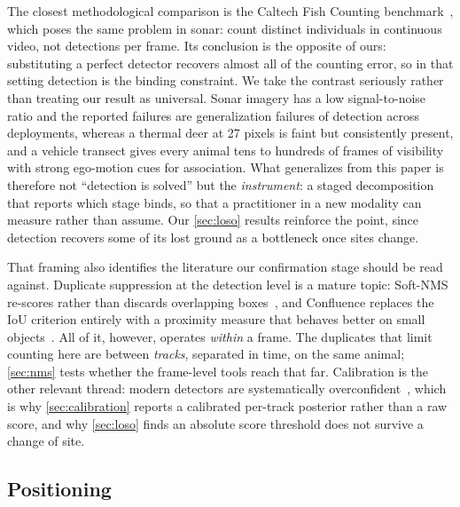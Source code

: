 The closest methodological comparison is the Caltech Fish Counting
benchmark~\cite{kay2022caltech}, which poses the same problem in sonar: count distinct individuals in continuous video, not detections per frame. Its conclusion is the opposite of
ours: substituting a perfect detector recovers almost all of the counting error, so in that
setting detection is the binding constraint. We take the contrast seriously rather than
treating our result as universal. Sonar imagery has a low signal-to-noise ratio and the reported failures are
generalization failures of detection across deployments, whereas a thermal deer at 27 pixels
is faint but consistently present, and a vehicle transect gives every animal tens to hundreds
of frames of visibility with strong ego-motion cues for association. What generalizes from
this paper is therefore not ``detection is solved'' but the \emph{instrument}: a staged
decomposition that reports which stage binds, so that a practitioner in a new modality can
measure rather than assume. Our \cref{sec:loso} results reinforce the point, since detection
recovers some of its lost ground as a bottleneck once sites change.

That framing also identifies the literature our confirmation stage should be read against.
Duplicate suppression at the detection level is a mature topic: Soft-NMS re-scores rather than discards overlapping boxes~\cite{bodla2017softnms}, and Confluence replaces the IoU criterion entirely with a proximity measure that behaves better on small objects~\cite{shuai2021confluence}. All of it, however, operates \emph{within} a frame. The
duplicates that limit counting here are between \emph{tracks}, separated in time, on the same
animal; \cref{sec:nms} tests whether the frame-level tools reach that far. Calibration is the
other relevant thread: modern detectors are systematically overconfident~\cite{guo2017calibration},
which is why \cref{sec:calibration} reports a calibrated per-track posterior rather than a raw
score, and why \cref{sec:loso} finds an absolute score threshold does not survive a change of
site.

\subsection{Positioning}

